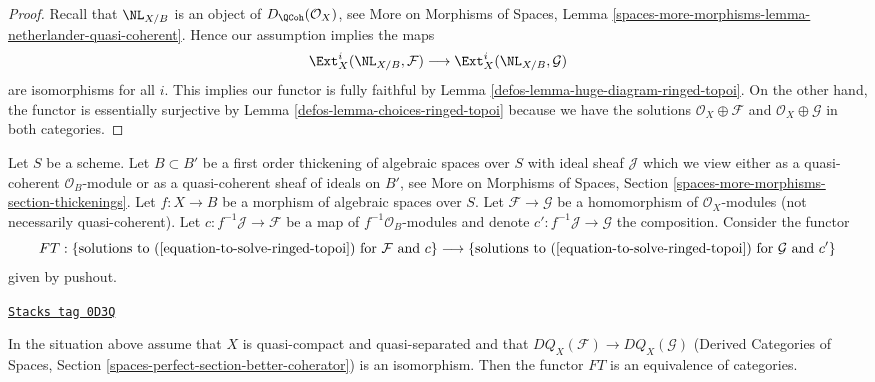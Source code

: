 \begin{proof}

Recall that $\NL_{X/B}$ is an object of $D_\QCoh(\mathcal{O}_X)$, see
More on Morphisms of Spaces, Lemma
\ref{spaces-more-morphisms-lemma-netherlander-quasi-coherent}.
Hence our assumption implies the maps
$$
\Ext^i_X(\NL_{X/B}, \mathcal{F}) \longrightarrow
\Ext^i_X(\NL_{X/B}, \mathcal{G})
$$
are isomorphisms for all $i$. This implies our functor is fully
faithful by Lemma \ref{defos-lemma-huge-diagram-ringed-topoi}.
On the other hand, the functor is essentially surjective by
Lemma \ref{defos-lemma-choices-ringed-topoi} because
we have the solutions $\mathcal{O}_X \oplus \mathcal{F}$
and $\mathcal{O}_X \oplus \mathcal{G}$ in both categories.
\end{proof}

Let $S$ be a scheme. Let $B \subset B'$ be a first order thickening of
algebraic spaces over $S$ with ideal sheaf $\mathcal{J}$
which we view either as a quasi-coherent $\mathcal{O}_B$-module
or as a quasi-coherent sheaf of ideals on $B'$, see
More on Morphisms of Spaces, Section
\ref{spaces-more-morphisms-section-thickenings}.
Let $f : X \to B$ be a morphism of algebraic spaces over $S$.
Let $\mathcal{F} \to \mathcal{G}$ be a homomorphism of
$\mathcal{O}_X$-modules (not necessarily quasi-coherent).
Let $c : f^{-1}\mathcal{J} \to \mathcal{F}$ be a map
of $f^{-1}\mathcal{O}_B$-modules and denote
$c' : f^{-1}\mathcal{J} \to \mathcal{G}$ the composition.
Consider the functor
$$
FT :
\{\text{solutions to }(\ref{equation-to-solve-ringed-topoi})
\text{ for }\mathcal{F}\text{ and }c\}
\longrightarrow
\{\text{solutions to }(\ref{equation-to-solve-ringed-topoi})
\text{ for }\mathcal{G}\text{ and }c'\}
$$
given by pushout.

\begin{lemma}
\label{defos-lemma-thickening-over-thickening-space-quasi-coherent}
\href{https://stacks.math.columbia.edu/tag/0D3Q}{\texttt{Stacks tag 0D3Q}}

In the situation above assume that $X$ is quasi-compact and quasi-separated
and that $DQ_X(\mathcal{F}) \to DQ_X(\mathcal{G})$
(Derived Categories of Spaces, Section
\ref{spaces-perfect-section-better-coherator})
is an isomorphism. Then the functor $FT$ is an equivalence of categories.
\end{lemma}

